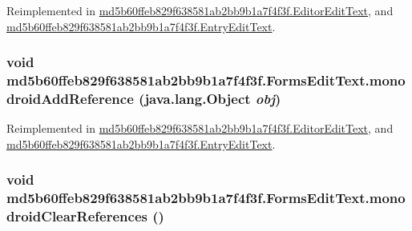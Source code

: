 Reimplemented in \hyperlink{classmd5b60ffeb829f638581ab2bb9b1a7f4f3f_1_1_editor_edit_text_3a913e8148e4f4e1aba30b8717b86dc3}{md5b60ffeb829f638581ab2bb9b1a7f4f3f.EditorEditText}, and \hyperlink{classmd5b60ffeb829f638581ab2bb9b1a7f4f3f_1_1_entry_edit_text_1bcb36e7b2e5e9adfbc72e37a3f9a778}{md5b60ffeb829f638581ab2bb9b1a7f4f3f.EntryEditText}.\hypertarget{classmd5b60ffeb829f638581ab2bb9b1a7f4f3f_1_1_forms_edit_text_abff92edb59e12022a3bad902cad5b3c}{
\subsubsection[{monodroidAddReference}]{\setlength{\rightskip}{0pt plus 5cm}void md5b60ffeb829f638581ab2bb9b1a7f4f3f.FormsEditText.monodroidAddReference (java.lang.Object {\em obj})}}
\label{classmd5b60ffeb829f638581ab2bb9b1a7f4f3f_1_1_forms_edit_text_abff92edb59e12022a3bad902cad5b3c}




Reimplemented in \hyperlink{classmd5b60ffeb829f638581ab2bb9b1a7f4f3f_1_1_editor_edit_text_2d346ebbcec03d19cb05949a57c42ca2}{md5b60ffeb829f638581ab2bb9b1a7f4f3f.EditorEditText}, and \hyperlink{classmd5b60ffeb829f638581ab2bb9b1a7f4f3f_1_1_entry_edit_text_7472d6c3ce83f5d2334598037d779849}{md5b60ffeb829f638581ab2bb9b1a7f4f3f.EntryEditText}.\hypertarget{classmd5b60ffeb829f638581ab2bb9b1a7f4f3f_1_1_forms_edit_text_842c9f28b9164b840f11c15e502397ff}{
\subsubsection[{monodroidClearReferences}]{\setlength{\rightskip}{0pt plus 5cm}void md5b60ffeb829f638581ab2bb9b1a7f4f3f.FormsEditText.monodroidClearReferences ()}}
\label{classmd5b60ffeb829f638581ab2bb9b1a7f4f3f_1_1_forms_edit_text_842c9f28b9164b840f11c15e502397ff}




